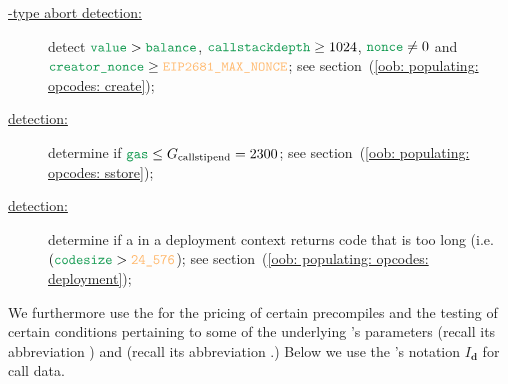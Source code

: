 \begin{description}
	\item[\underline{-type abort detection:}]
		detect $\loc{value} > \loc{balance}$, $\loc{callstackdepth} \ge 1024$, $\locNonce \neq 0$ and $\locCreatorNonce \geq \maxNonce$;
		see section~(\ref{oob: populating: opcodes: create});
	\item[\underline{\sstorexSH{} detection:}]
		determine if $\loc{gas} \leq G_\text{callstipend} = 2300$;
		see section~(\ref{oob: populating: opcodes: sstore});
	\item[\underline{\maxcsxSH{} detection:}]
		determine if a  in a deployment context returns code that is too long (i.e. $(\loc{codesize} > \maxCodeSizeValue$);
		see section~(\ref{oob: populating: opcodes: deployment});
\end{description}
We furthermore use the \oobMod{} for the pricing of certain precompiles and the testing of certain conditions pertaining to some of the underlying 's parameters
\CDS{} (recall its abbreviation \cds{}) and
\RAC{} (recall its abbreviation \rac{}.)
\saNote{} Below we use the \cite{EYP-London}'s notation $I_\textbf{d}$ for call data.
